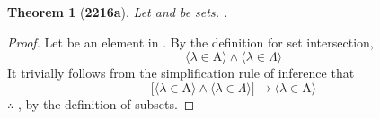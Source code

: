 \documentclass[preview]{standalone}
\newtheorem*{theorem*}{Theorem}
\begin{document}
\begin{theorem*}[\textbf{2216a}] \color{black}
    Let  and \bm{$\Lambda$} be sets. 
    .
\end{theorem*}
\begin{proof} \color{black}
    Let \bm{$\lambda$} be an element in . 
    By the definition for set intersection,
    \begin{equation*}
        \Big \langle \lambda \in \mathrm{A} \Big \rangle 
            \land 
        \Big \langle \lambda \in \Lambda \Big \rangle   
    \end{equation*}
    It trivially follows from the simplification rule of inference that 
    \begin{equation*}
        \bigg[
            \Big \langle \lambda \in \mathrm{A} \Big \rangle 
                \land 
            \Big \langle \lambda \in \Lambda \Big \rangle
        \bigg]
            \rightarrow
        \Big \langle \lambda \in \mathrm{A} \Big \rangle
    \end{equation*}
    $\therefore$ 
    , by the definition of subsets.
\color{lightgray} \end{proof}
\end{document}
